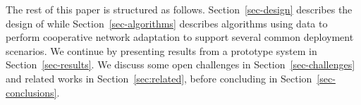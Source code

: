 The rest of this paper is structured as follows. Section~\ref{sec-design}
describes the design of \PS{} while Section~\ref{sec-algorithms} describes
algorithms using \PS{} data to perform cooperative network adaptation to support
several common deployment scenarios. We continue by presenting results from a
prototype \PS{} system in Section~\ref{sec-results}.  We discuss some open
challenges in Section~\ref{sec-challenges} and related works in
Section~\ref{sec:related}, before concluding in Section~\ref{sec-conclusions}.

